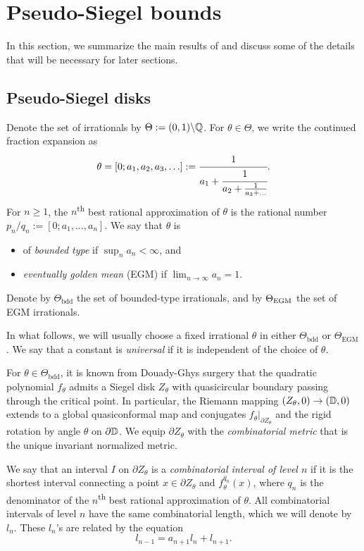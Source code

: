 \documentclass{amsart}
\begin{document}
\section{Pseudo-Siegel bounds}

In this section, we summarize the main results of \cite{DL22} and discuss some of the details that will be necessary for later sections.

\subsection{Pseudo-Siegel disks} 
\label{ss:pseudo-siegel}

Denote the set of irrationals by $\Theta := (0,1) \backslash \mathbb{Q}$. For $\theta \in \Theta$, we write the continued fraction expansion as
\[
    \theta = [0;a_1,a_2,a_3,\ldots]:= \cfrac{1}{a_1 + \cfrac{1}{a_2 + \frac{1}{a_3 + \ldots }}}.
\]
For $n \geq 1$, the $n$\textsuperscript{th} best rational approximation of $\theta$ is the rational number $p_n/q_n:= [0;a_1,\ldots,a_n]$. 
We say that $\theta$ is 
\begin{itemize}
    \item of \emph{bounded type} if $\sup_n a_n < \infty$, and 
    \item \emph{eventually golden mean} (EGM) if $\lim_{n\to \infty} a_n = 1$. 
\end{itemize}
Denote by $\Theta_{\text{bdd}}$ the set of bounded-type irrationals, and by $\Theta_{\text{\text{EGM}}}$ the set of EGM irrationals.

In what follows, we will usually choose a fixed irrational $\theta$ in either $\Theta_{\text{bdd}}$ or $\Theta_{\text{EGM}}$.
We say that a constant is \emph{universal} if it is independent of the choice of $\theta$.

For $\theta \in \Theta_{\text{bdd}}$, it is known from Douady-Ghys surgery \cite{D87,G84} that the quadratic polynomial $f_\theta$ admits a Siegel disk $Z_\theta$ with quasicircular boundary passing through the critical point.
In particular, the Riemann mapping $(Z_\theta,0) \to (\mathbb{D},0)$ extends to a global quasiconformal map and conjugates $f_\theta|_{\partial Z_\theta}$ and the rigid rotation by angle $\theta$ on $\partial \mathbb{D}$.
We equip $\partial Z_\theta$ with the \emph{combinatorial metric} that is the unique invariant normalized metric.

We say that an interval $I$ on $\partial Z_\theta$ is a \emph{combinatorial interval of level $n$} if it is the shortest interval connecting a point $x \in \partial Z_\theta$ and $f^{q_n}_\theta(x)$, where $q_n$ is the denominator of the $n$\textsuperscript{th} best rational approximation of $\theta$.
All combinatorial intervals of level $n$ have the same combinatorial length, which we will denote by $l_n$. These $l_n$'s are related by the equation
\[
    l_{n-1} = a_{n+1} l_n + l_{n+1}.
\]
\end{document}
